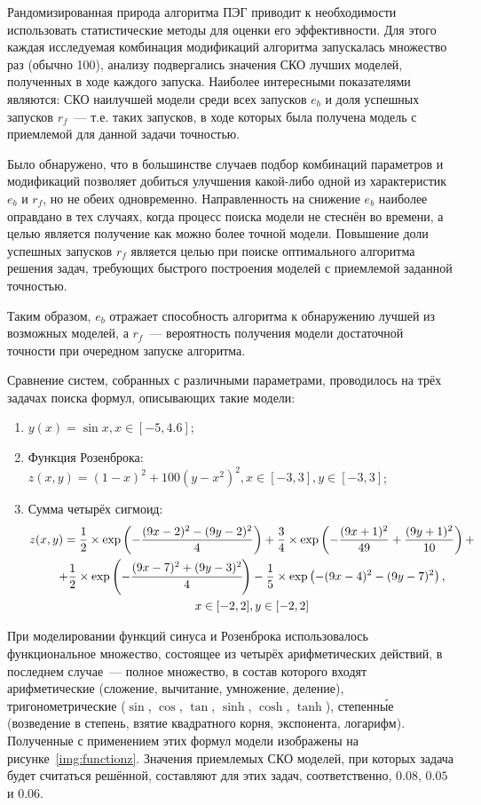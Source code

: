Рандомизированная природа алгоритма ПЭГ приводит к необходимости использовать статистические методы для оценки его эффективности. Для этого каждая исследуемая комбинация модификаций алгоритма запускалась множество раз (обычно 100), анализу подвергались значения СКО лучших моделей, полученных в ходе каждого запуска. Наиболее интересными показателями являются: СКО наилучшей модели среди всех запусков $e_{b}$ и доля успешных запусков $r_{f}$~--- т.е. таких запусков, в ходе которых была получена модель с приемлемой для данной задачи точностью.

Было обнаружено, что в большинстве случаев подбор комбинаций параметров и модификаций позволяет добиться улучшения какой-либо одной из характеристик $e_{b}$ и $r_{f}$, но не обеих одновременно. Направленность на снижение $e_{b}$ наиболее оправдано в тех случаях, когда процесс поиска модели не стеснён во времени, а целью является получение как можно более точной модели. Повышение доли успешных запусков $r_{f}$ является целью при поиске оптимального алгоритма решения задач, требующих быстрого построения моделей с приемлемой заданной точностью.

Таким образом, $e_{b}$ отражает способность алгоритма к обнаружению лучшей из возможных моделей, а $r_{f}$~--- вероятность получения модели достаточной точности при очередном запуске алгоритма.

Сравнение систем, собранных с различными параметрами, проводилось на трёх задачах поиска формул, описывающих такие модели:
\begin{enumerate}
  \item $y(x) = \sin x, x \in [-5, 4.6]$;
  \item Функция Розенброка: $z(x, y) = {(1 - x)}^2 + 100 {(y - x^2)}^2, x \in [-3, 3], y \in [-3, 3]$;
  \item Сумма четырёх сигмоид:
    \begin{multline}
      z(x, y) = \frac{1}{2} \times \exp\left(-\frac{(9x-2)^2 - (9y-2)^2}{4}\right) + \frac{3}{4} \times \exp\left(-\frac{(9x+1)^2}{49} + \frac{(9y+1)^2}{10}\right) + \\
      + \frac{1}{2} \times \exp\left(-\cfrac{(9x-7)^2 + (9y-3)^2}{4}\right) -\frac{1}{5} \times \exp\left(-(9x-4)^2 - (9y-7)^2\right), \\
      x \in [-2, 2], y \in [-2, 2]
    \end{multline}
\end{enumerate}

При моделировании функций синуса и Розенброка использовалось функциональное множество, состоящее из четырёх арифметических действий, в последнем случае~--- полное множество, в состав которого входят арифметические (сложение, вычитание, умножение, деление), тригонометрические ($\sin$, $\cos$, $\tan$, $\sinh$, $\cosh$, $\tanh$), степенн\'{ы}е (возведение в степень, взятие квадратного корня, экспонента, логарифм). Полученные с применением этих формул модели изображены на рисунке~\ref{img:functionz}. Значения приемлемых СКО моделей, при которых задача будет считаться решённой, составляют для этих задач, соответственно, $0.08$, $0.05$ и $0.06$.

